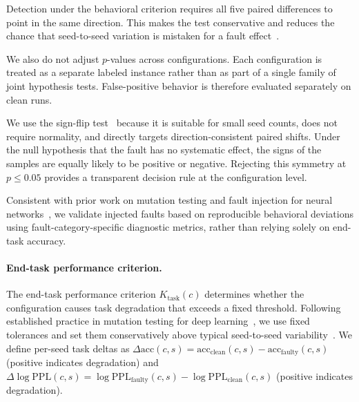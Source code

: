 Detection under the behavioral criterion requires all five paired differences to point in the same direction. This makes the test conservative and reduces the chance that seed-to-seed variation is mistaken for a fault effect~\citep{mosbach2021stability}.

We also do not adjust $p$-values across configurations. Each configuration is treated as a separate labeled instance rather than as part of a single family of joint hypothesis tests. False-positive behavior is therefore evaluated separately on clean runs.

We use the sign-flip test~\citep{good2005permutation} because it is suitable for small seed counts, does not require normality, and directly targets direction-consistent paired shifts. Under the null hypothesis that the fault has no systematic effect, the signs of the samples are equally likely to be positive or negative. Rejecting this symmetry at $p \le 0.05$ provides a transparent decision rule at the configuration level.

Consistent with prior work on mutation testing and fault injection for neural networks~\citep{deepmutation,deepmutation++,deepcrime}, we validate injected faults based on reproducible behavioral deviations using fault-category-specific diagnostic metrics, rather than relying solely on end-task accuracy.

\paragraph{End-task performance criterion.}
The end-task performance criterion $K_{\text{task}}(c)$ determines whether the configuration causes task degradation that exceeds a fixed threshold. Following established practice in mutation testing for deep learning~\citep{deepmutation,deepmutation++,deepcrime}, we use fixed tolerances and set them conservatively above typical seed-to-seed variability~\citep{mosbach2021stability}. We define per-seed task deltas as $\Delta\text{acc}(c, s) = \text{acc}_{\text{clean}}(c,s) - \text{acc}_{\text{faulty}}(c,s)$ (positive indicates degradation) and $\Delta\log\text{PPL}(c, s) = \log\text{PPL}_{\text{faulty}}(c,s) - \log\text{PPL}_{\text{clean}}(c,s)$ (positive indicates degradation).

